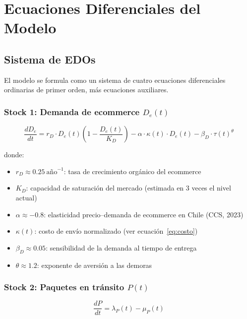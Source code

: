 \documentclass[12pt,a4paper]{article}
\begin{document}
\section{Ecuaciones Diferenciales del Modelo}

\subsection{Sistema de EDOs}

El modelo se formula como un sistema de cuatro ecuaciones diferenciales
ordinarias de primer orden, más ecuaciones auxiliares.

\subsubsection{Stock 1: Demanda de ecommerce $D_e(t)$}

\begin{equation}
\boxed{
\frac{dD_e}{dt} = r_D \cdot D_e(t)\left(1 - \frac{D_e(t)}{K_D}\right)
  - \alpha \cdot \kappa(t) \cdot D_e(t)
  - \beta_{D} \cdot \tau(t)^{\theta}
}
\label{eq:demanda}
\end{equation}

donde:
\begin{itemize}[leftmargin=2cm,itemsep=2pt]
  \item $r_D \approx 0.25\ \text{año}^{-1}$: tasa de crecimiento orgánico del ecommerce
  \item $K_D$: capacidad de saturación del mercado (estimada en 3 veces el nivel actual)
  \item $\alpha \approx -0.8$: elasticidad precio--demanda de ecommerce en Chile (CCS, 2023)
  \item $\kappa(t)$: costo de envío normalizado (ver ecuación~\ref{eq:costo})
  \item $\beta_D \approx 0.05$: sensibilidad de la demanda al tiempo de entrega
  \item $\theta \approx 1.2$: exponente de aversión a las demoras
\end{itemize}

\subsubsection{Stock 2: Paquetes en tránsito $P(t)$}

\begin{equation}
\boxed{
\frac{dP}{dt} = \lambda_P(t) - \mu_P(t)
}
\label{eq:paquetes}
\end{equation}
\end{document}
